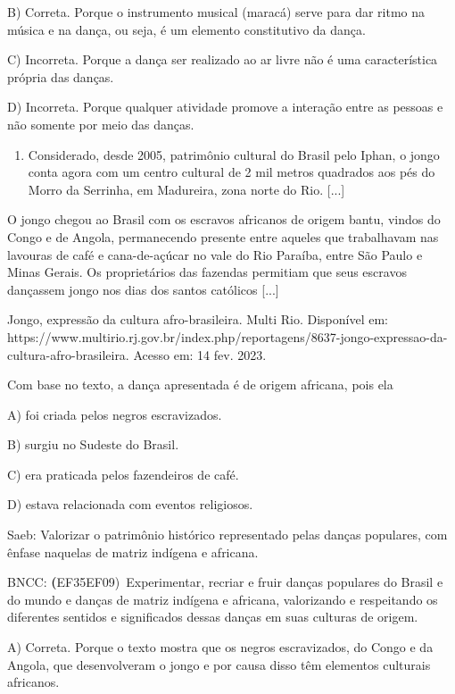 B) Correta. Porque o instrumento musical (maracá) serve para dar ritmo
na música e na dança, ou seja, é um elemento constitutivo da dança.

C) Incorreta. Porque a dança ser realizado ao ar livre não é uma
característica própria das danças.

D) Incorreta. Porque qualquer atividade promove a interação entre as
pessoas e não somente por meio das danças.

\begin{enumerate}
\def\labelenumi{\arabic{enumi}.}
\item
  Considerado, desde 2005, patrimônio cultural do Brasil pelo Iphan, o
  jongo conta agora com um centro cultural de 2 mil metros quadrados aos
  pés do Morro da Serrinha, em Madureira, zona norte do Rio. {[}...{]}
\end{enumerate}

O jongo chegou ao Brasil com os escravos africanos de origem bantu,
vindos do Congo e de Angola, permanecendo presente entre aqueles que
trabalhavam nas lavouras de café e cana-de-açúcar no vale do Rio
Paraíba, entre São Paulo e Minas Gerais. Os proprietários das fazendas
permitiam que seus escravos dançassem jongo nos dias dos santos
católicos {[}...{]}

Jongo, expressão da cultura afro-brasileira. Multi Rio. Disponível em:
https://www.multirio.rj.gov.br/index.php/reportagens/8637-jongo-expressao-da-cultura-afro-brasileira.
Acesso em: 14 fev. 2023.

Com base no texto, a dança apresentada é de origem africana, pois ela

A) foi criada pelos negros escravizados.

B) surgiu no Sudeste do Brasil.

C) era praticada pelos fazendeiros de café.

D) estava relacionada com eventos religiosos.

Saeb: Valorizar o patrimônio histórico representado pelas danças
populares, com ênfase naquelas de matriz indígena e africana.

BNCC: \textbf{(}EF35EF09)~Experimentar, recriar e fruir danças populares
do Brasil e do mundo e danças de matriz indígena e africana, valorizando
e respeitando os diferentes sentidos e significados dessas danças em
suas culturas de origem.

A) Correta. Porque o texto mostra que os negros escravizados, do Congo e
da Angola, que desenvolveram o jongo e por causa disso têm elementos
culturais africanos.

